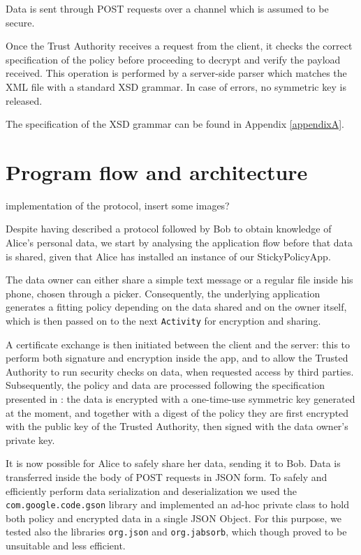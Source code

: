 Data is sent through POST requests over a channel which is assumed to be secure.

Once the Trust Authority receives a request from the client, it checks the correct specification of the policy before proceeding to decrypt and verify the payload received. This operation is performed by a server-side parser which matches the XML file with a standard XSD grammar. In case of errors, no symmetric key is released.

The specification of the XSD grammar can be found in Appendix \ref{appendixA}. 

\section{Program flow and architecture}
implementation of the protocol, insert some images?


Despite having described a protocol followed by Bob to obtain knowledge of Alice's personal data, we start by analysing the application flow before that data is shared, given that Alice has installed an instance of our StickyPolicyApp.

The data owner can either share a simple text message or a regular file inside his phone, chosen through a picker. Consequently, the underlying application generates a fitting policy depending on the data shared and on the owner itself, which is then passed on to the next \texttt{Activity} for encryption and sharing.

A certificate exchange is then initiated between the client and the server: this to perform both signature and encryption inside the app, and to allow the Trusted Authority to run security checks on data, when requested access by third parties. Subsequently, the policy and data are processed following the specification presented in \cite{mont2003towards}: the data is encrypted with a one-time-use symmetric key generated at the moment, and together with a digest of the policy they are first encrypted with the public key of the Trusted Authority, then signed with the data owner's private key.

It is now possible for Alice to safely share her data, sending it to Bob. Data is transferred inside the body of POST requests in JSON form. To safely and efficiently perform data serialization and deserialization we used the \texttt{com.google.code.gson} library and implemented an ad-hoc private class to hold both policy and encrypted data in a single JSON Object. For this purpose, we tested also the libraries \texttt{org.json} and \texttt{org.jabsorb}, which though proved to be unsuitable and less efficient.

